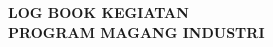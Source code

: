 {\centering
    {\large\bfseries LOG BOOK KEGIATAN}\\[2pt]
    {\large\bfseries PROGRAM MAGANG INDUSTRI}\par
}
\vspace{4pt}
